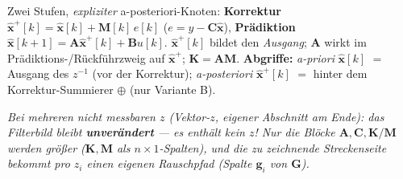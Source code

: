 \vspace{0.12em}
\parbox{0.97\linewidth}{\footnotesize Zwei Stufen, \emph{expliziter} a-posteriori-Knoten:\;
\textbf{Korrektur} $\hat{\mathbf x}^{+}[k]=\hat{\mathbf x}[k]+\mathbf M[k]\,e[k]$ ($e{=}y-\mathbf C\hat{\mathbf x}$),\;
\textbf{Prädiktion} $\hat{\mathbf x}[k{+}1]=\mathbf A\hat{\mathbf x}^{+}[k]+\mathbf B u[k]$.\;
$\hat{\mathbf x}^{+}[k]$ bildet den \emph{Ausgang}; $\mathbf A$ wirkt im Prädiktions-/Rückführzweig auf $\hat{\mathbf x}^{+}$;\; $\mathbf K=\mathbf A\mathbf M$.\;
\textbf{Abgriffe:} \emph{a-priori} $\hat{\mathbf x}[k]$ $=$ Ausgang des $z^{-1}$ (vor der Korrektur); \emph{a-posteriori} $\hat{\mathbf x}^{+}[k]$ $=$ hinter dem Korrektur-Summierer $\oplus$ (nur Variante B).}\par\raggedright
\vspace{0.15em}
\parbox{0.97\linewidth}{\footnotesize\itshape
Bei \emph{mehreren} nicht messbaren $z$ (Vektor-$z$, eigener Abschnitt am Ende): das Filterbild bleibt
\textbf{unverändert} — es enthält \emph{kein} $z$! Nur die Blöcke $\mathbf A,\mathbf C,\mathbf K/\mathbf M$
werden größer ($\mathbf K,\mathbf M$ als $n{\times}1$-Spalten), und die zu zeichnende Streckenseite
bekommt pro $z_i$ einen eigenen Rauschpfad (Spalte $\mathbf g_i$ von $\mathbf G$).}\par\raggedright
\bereichende


